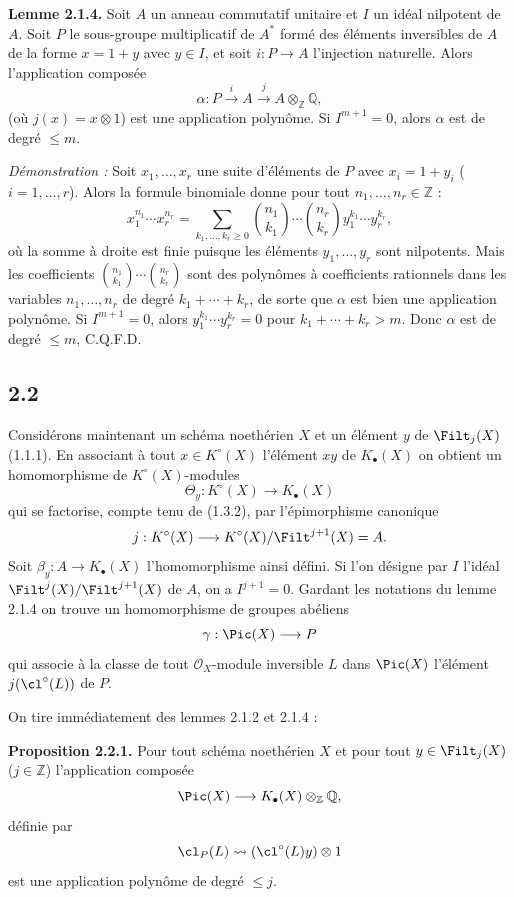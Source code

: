 \textbf{Lemme 2.1.4.} Soit $A$ un anneau commutatif unitaire et $I$ un idéal nilpotent de $A$. Soit $P$ le sous-groupe multiplicatif de $A^*$ formé des éléments inversibles de $A$ de la forme $x=1+y$ avec $y\in I$, et soit $i:P\to A$ l'injection naturelle. Alors l'application composée
\[
\alpha:P\xrightarrow{i}A\xrightarrow{j}A\otimes_{\mathbb Z}\mathbb Q,
\]
(où $j(x)=x\otimes1$) est une application polynôme. Si $I^{m+1}=0$, alors $\alpha$ est de degré $\leq m$.

\emph{Démonstration :} Soit $x_1,\ldots,x_r$ une suite d'éléments de $P$ avec $x_i=1+y_i$ ($i=1,\ldots,r$). Alors la formule binomiale donne pour tout $n_1,\ldots,n_r\in\mathbb Z$ :
\begin{equation}\tag{2.1.5}
x_1^{n_1}\cdots x_r^{n_r}=
\sum_{k_1,\ldots,k_r\geq0}\binom{n_1}{k_1}\cdots\binom{n_r}{k_r}y_1^{k_1}\cdots y_r^{k_r},
\end{equation}
où la somme à droite est finie puisque les éléments $y_1,\ldots,y_r$ sont nilpotents. Mais les coefficients $\binom{n_1}{k_1}\cdots\binom{n_r}{k_r}$ sont des polynômes à coefficients rationnels dans les variables $n_1,\ldots,n_r$ de degré $k_1+\cdots+k_r$, de sorte que $\alpha$ est bien une application polynôme. Si $I^{m+1}=0$, alors $y_1^{k_1}\cdots y_r^{k_r}=0$ pour $k_1+\cdots+k_r>m$. Donc $\alpha$ est de degré $\leq m$, C.Q.F.D.

\subsection*{2.2}
Considérons maintenant un schéma noethérien $X$ et un élément $y$ de $\Filt_j(X)$ (1.1.1). En associant à tout $x\in K^\circ(X)$ l'élément $xy$ de $K_\bullet(X)$ on obtient un homomorphisme de $K^\circ(X)$-modules
\[
\Theta_y:K^\circ(X)\longrightarrow K_\bullet(X)
\]
qui se factorise, compte tenu de (1.3.2), par l'épimorphisme canonique
\[
j:K^\circ(X)\longrightarrow K^\circ(X)/\Filt^{j+1}(X)=A.
\]
Soit $\beta_y:A\to K_\bullet(X)$ l'homomorphisme ainsi défini. Si l'on désigne par $I$ l'idéal $\Filt^j(X)/\Filt^{j+1}(X)$ de $A$, on a $I^{j+1}=0$. Gardant les notations du lemme 2.1.4 on trouve un homomorphisme de groupes abéliens
\[
\gamma:\Pic(X)\longrightarrow P
\]
qui associe à la classe de tout $\mathcal O_X$-module inversible $L$ dans $\Pic(X)$ l'élément $j(\cl^\circ(L))$ de $P$.

On tire immédiatement des lemmes 2.1.2 et 2.1.4 :

\textbf{Proposition 2.2.1.} Pour tout schéma noethérien $X$ et pour tout $y\in\Filt_j(X)$ ($j\in\mathbb Z$) l'application composée
\[
\Pic(X)\longrightarrow K_\bullet(X)\otimes_{\mathbb Z}\mathbb Q,
\]
définie par
\[
\cl_P(L)\rightsquigarrow (\cl^\circ(L)y)\otimes1
\]
est une application polynôme de degré $\leq j$.

